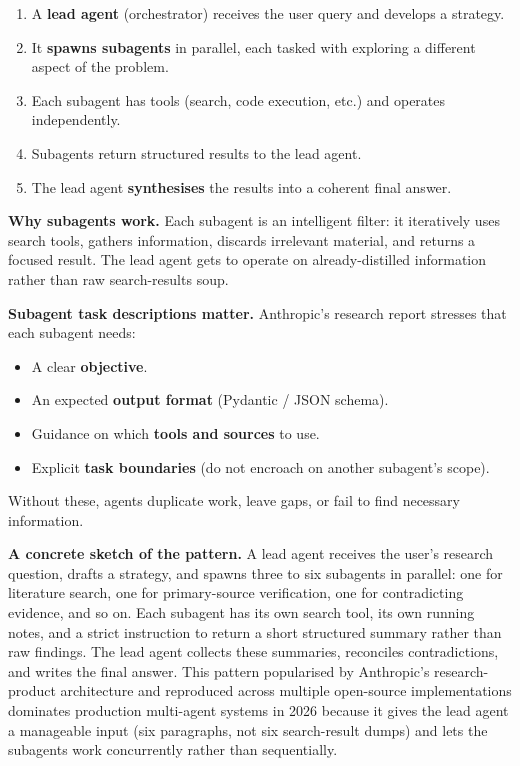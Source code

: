 \documentclass[a4paper,11pt]{article}
\begin{document}
\begin{enumerate}[noitemsep, leftmargin=1.4em]
  \item A \textbf{lead agent} (orchestrator) receives the user query
        and develops a strategy.
  \item It \textbf{spawns subagents} in parallel, each tasked with
        exploring a different aspect of the problem.
  \item Each subagent has tools (search, code execution, etc.) and
        operates independently.
  \item Subagents return structured results to the lead agent.
  \item The lead agent \textbf{synthesises} the results into a
        coherent final answer.
\end{enumerate}

\textbf{Why subagents work.} Each subagent is an intelligent filter:
it iteratively uses search tools, gathers information, discards
irrelevant material, and returns a focused result. The lead agent
gets to operate on already-distilled information rather than raw
search-results soup.

\textbf{Subagent task descriptions matter.} Anthropic's research
report stresses that each subagent needs:

\begin{itemize}[noitemsep, leftmargin=1.2em]
  \item A clear \textbf{objective}.
  \item An expected \textbf{output format} (Pydantic / JSON schema).
  \item Guidance on which \textbf{tools and sources} to use.
  \item Explicit \textbf{task boundaries} (do not encroach on
        another subagent's scope).
\end{itemize}

Without these, agents duplicate work, leave gaps, or fail to find
necessary information.

\begin{callout}
\textbf{A concrete sketch of the pattern.}
A lead agent receives the user's research question, drafts a
strategy, and spawns three to six subagents in parallel: one for
literature search, one for primary-source verification, one for
contradicting evidence, and so on. Each subagent has its own search
tool, its own running notes, and a strict instruction to return a
short structured summary rather than raw findings. The lead agent
collects these summaries, reconciles contradictions, and writes the
final answer. This pattern \textemdash{} popularised by Anthropic's
research-product architecture and reproduced across multiple
open-source implementations \textemdash{} dominates production
multi-agent systems in 2026 because it gives the lead agent a
manageable input (six paragraphs, not six search-result dumps) and
lets the subagents work concurrently rather than sequentially.
\end{callout}
\end{document}
